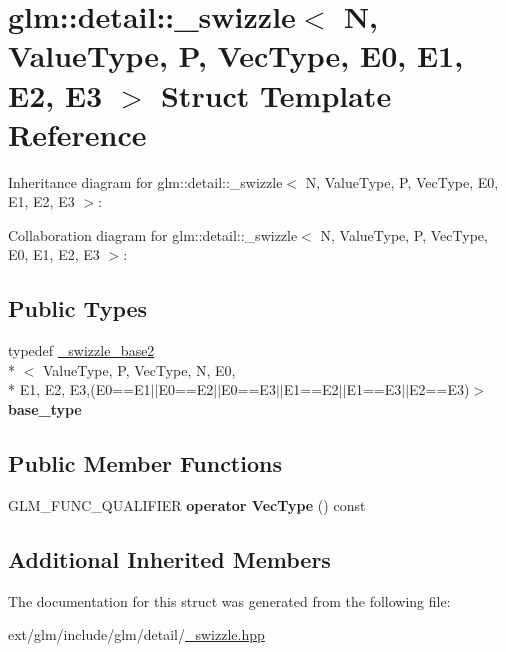 \hypertarget{structglm_1_1detail_1_1__swizzle}{\section{glm\-:\-:detail\-:\-:\-\_\-swizzle$<$ N, Value\-Type, P, Vec\-Type, E0, E1, E2, E3 $>$ Struct Template Reference}
\label{structglm_1_1detail_1_1__swizzle}
}


Inheritance diagram for glm\-:\-:detail\-:\-:\-\_\-swizzle$<$ N, Value\-Type, P, Vec\-Type, E0, E1, E2, E3 $>$\-:


Collaboration diagram for glm\-:\-:detail\-:\-:\-\_\-swizzle$<$ N, Value\-Type, P, Vec\-Type, E0, E1, E2, E3 $>$\-:
\subsection*{Public Types}
\begin{DoxyCompactItemize}
\item 
\hypertarget{structglm_1_1detail_1_1__swizzle_acf7dfa9d7456eb833c247473c5a045f4}{typedef \hyperlink{structglm_1_1detail_1_1__swizzle__base2}{\-\_\-swizzle\-\_\-base2}\\*
$<$ Value\-Type, P, Vec\-Type, N, E0, \\*
E1, E2, E3,(E0==E1$\vert$$\vert$E0==E2$\vert$$\vert$E0==E3$\vert$$\vert$E1==E2$\vert$$\vert$E1==E3$\vert$$\vert$E2==E3)$>$ {\bfseries base\-\_\-type}}\label{structglm_1_1detail_1_1__swizzle_acf7dfa9d7456eb833c247473c5a045f4}

\end{DoxyCompactItemize}
\subsection*{Public Member Functions}
\begin{DoxyCompactItemize}
\item 
\hypertarget{structglm_1_1detail_1_1__swizzle_a333cdd33d2fb442775cca23c77e63fca}{G\-L\-M\-\_\-\-F\-U\-N\-C\-\_\-\-Q\-U\-A\-L\-I\-F\-I\-E\-R {\bfseries operator Vec\-Type} () const }\label{structglm_1_1detail_1_1__swizzle_a333cdd33d2fb442775cca23c77e63fca}

\end{DoxyCompactItemize}
\subsection*{Additional Inherited Members}


The documentation for this struct was generated from the following file\-:\begin{DoxyCompactItemize}
\item 
ext/glm/include/glm/detail/\hyperlink{__swizzle_8hpp}{\-\_\-swizzle.\-hpp}\end{DoxyCompactItemize}
